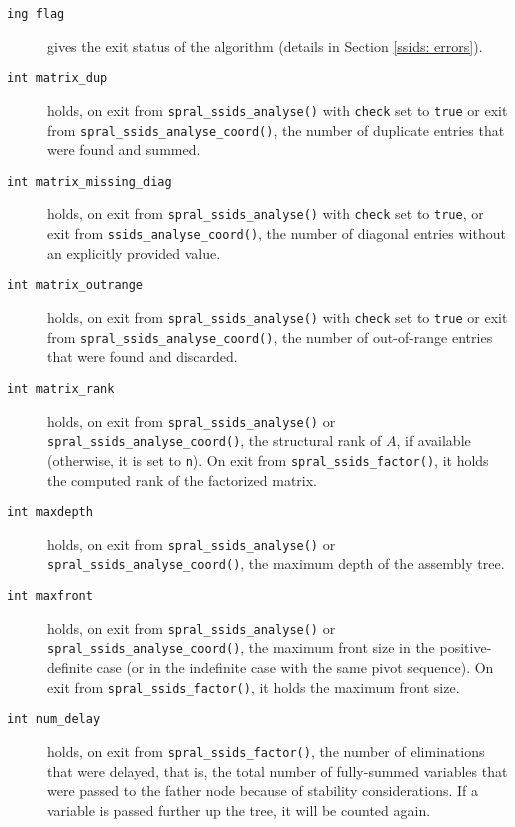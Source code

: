 \begin{description}

\item[\texttt{ing flag}] gives the exit status of the algorithm (details in Section \ref{ssids: errors}).

\item[\texttt{int matrix\_dup}] holds, on exit from
{\tt spral\_ssids\_analyse()} with {\tt check} set to {\tt true} or exit from
{\tt spral\_ssids\_analyse\_coord()}, the
number of duplicate entries that were found and summed.

\item[\texttt{int matrix\_missing\_diag}] holds, on exit from
{\tt spral\_ssids\_analyse()} with {\tt check} set to {\tt true},
or exit from {\tt ssids\_analyse\_coord()}, the number of diagonal
entries without an explicitly provided value.

\item[\texttt{int matrix\_outrange}] holds, on exit from
{\tt spral\_ssids\_analyse()} with {\tt check} set to {\tt true} or exit from 
{\tt spral\_ssids\_analyse\_coord()}, the
number of out-of-range entries that were   found and discarded.

\item[\texttt{int matrix\_rank}] holds, on exit from
{\tt spral\_ssids\_analyse()} or {\tt spral\_ssids\_analyse\_coord()},
the structural rank of $A$, if available (otherwise, it is set to {\tt n}).
On exit from
{\tt spral\_ssids\_factor()}, it holds the computed rank of
the factorized matrix.

\item[\texttt{int maxdepth}] holds, on exit from
{\tt spral\_ssids\_analyse()} or {\tt spral\_ssids\_analyse\_coord()},
the maximum depth of the assembly tree.

\item[\texttt{int maxfront}] holds, on exit from
{\tt spral\_ssids\_analyse()} or {\tt spral\_ssids\_analyse\_coord()}, 
the maximum front size
in the positive-definite case (or in the indefinite case with
the same pivot sequence). On exit from
{\tt spral\_ssids\_factor()}, it holds the maximum front size.

\item[\texttt{int num\_delay}] holds, on exit from
{\tt spral\_ssids\_factor()}, the
number of eliminations that were
delayed, that is, the total number of fully-summed
variables that were passed to the father node because
of stability considerations. If a variable is passed
further up the tree, it will be counted again.


\end{description}
